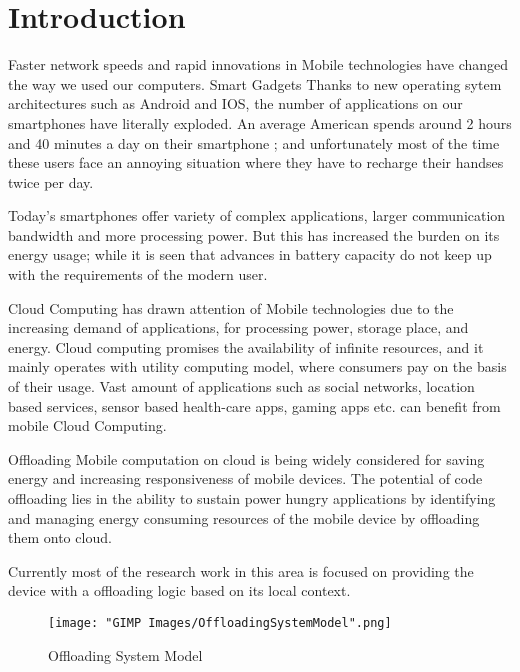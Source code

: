 \documentclass[12pt]{report}
\begin{document}
\chapter{Introduction} %
\label{chap:Introduction}

Faster network speeds and rapid innovations in Mobile technologies have changed the way we used our computers. Smart Gadgets Thanks to new operating sytem architectures such as Android and IOS, the number of applications on our smartphones have literally exploded. An average American spends around 2 hours and 40 minutes a day on their smartphone \cite{averageAmerican}; and unfortunately most of the time these users face an annoying situation where they have to recharge their handses twice per day. 
  
Today's smartphones offer variety of complex applications, larger communication bandwidth and more processing power. But this has increased the burden on its energy usage; while it is seen that advances in battery capacity do not keep up with the requirements of the modern user.

Cloud Computing has drawn attention of Mobile technologies due to the increasing demand of applications, for processing power, storage place, and energy. Cloud computing promises the availability of infinite resources, and it mainly operates with utility computing model, where consumers pay on the basis of their usage. Vast amount of applications such as social networks, location based services, sensor based health-care apps, gaming apps etc. can benefit from mobile Cloud Computing.

Offloading Mobile computation on cloud is being widely considered for saving energy and increasing responsiveness of mobile devices.
The potential of code offloading lies in the ability to sustain power hungry applications by identifying and managing energy consuming resources of the mobile device by offloading them onto cloud. 

Currently most of the research work in this area is focused on providing the device with a offloading logic based on its local context.

\begin{figure}[h]
  \centering
  \texttt{[image: "GIMP Images/OffloadingSystemModel".png]}
  \caption{Offloading System Model}
  \label{fig:OffloadingSystemModel}
\end{figure}
\end{document}
